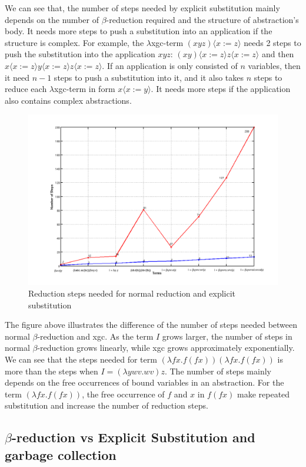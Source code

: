 We can see that, the number of steps needed by explicit substitution mainly depends on the number of $\beta$-reduction required and the structure of abstraction's body. It needs more steps to push a substitution into an application if the structure is complex. For example, the $\lambda$xgc-term $(xyz)\langle x:=z\rangle$ needs 2 steps to push the substitution into the application $xyz$:  $(xy)\langle x:=z\rangle z\langle x:=z\rangle$ and then $x\langle x:=z\rangle y\langle x:=z\rangle z\langle x:=z\rangle$. If an application is only consisted of $n$ variables, then it need $n-1$ steps to push a substitution into it, and it also takes $n$ steps to reduce each $\lambda$xgc-term in form $x\langle x:=y\rangle$. It needs more steps if the application also contains complex abstractions. 


\begin{figure}[ht]
\includegraphics[width=\textwidth]{pics/zhang}
\caption{Reduction steps needed for normal reduction and explicit substitution}
\label{fig:termraw}
\end{figure}

The figure above illustrates the difference of the number of steps needed between normal $\beta$-reduction and xgc. As the term $I$ grows larger, the number of steps in normal $\beta$-reduction grows linearly, while xgc grows approximately exponentially. We can see that the steps needed for term $(\lambda fx.f(fx))(\lambda fx.f(fx))$ is more than the steps when $I = (\lambda ywv.wv)z$. The number of steps mainly depends on the free occurrences of bound variables in an abstraction. For the term $(\lambda fx.f(fx))$, the free occurrence of $f$ and $x$ in $f(fx)$ make repeated substitution and increase the number of reduction steps.  


\subsection{$\beta$-reduction vs Explicit Substitution and garbage collection}








